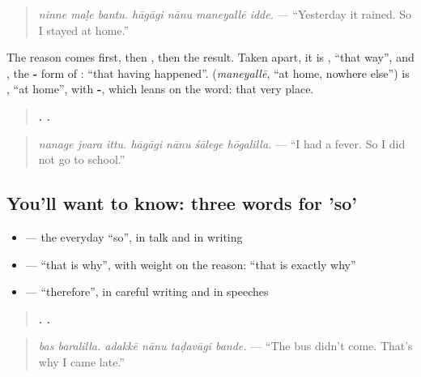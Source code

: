 \begin{quote}
\emph{ninne maḷe bantu. hāgāgi nānu maneyallē idde.} — \textquotedblleft{}Yesterday it rained. So I stayed at home.\textquotedblright{}
\end{quote}

The reason comes first, then \textbf{}, then the result. Taken apart, it is \textbf{}, \textquotedblleft{}that way\textquotedblright{}, and \textbf{}, the \textbf{-} form of \textbf{}: \textquotedblleft{}that having happened\textquotedblright{}. \textbf{} (\emph{maneyallē}, \textquotedblleft{}at home, nowhere else\textquotedblright{}) is \textbf{}, \textquotedblleft{}at home\textquotedblright{}, with \textbf{-}, which leans on the word: that very place.

\begin{quote}
\textbf{  .    .}
\end{quote}

\begin{quote}
\emph{nanage jvara ittu. hāgāgi nānu śālege hōgalilla.} — \textquotedblleft{}I had a fever. So I did not go to school.\textquotedblright{}
\end{quote}

\subsection*{You'll want to know: three words for 'so'}
\begin{itemize}
\raggedright
  \item \textbf{} — the everyday \textquotedblleft{}so\textquotedblright{}, in talk and in writing
  \item \textbf{} — \textquotedblleft{}that is why\textquotedblright{}, with weight on the reason: \textquotedblleft{}that is exactly why\textquotedblright{}
  \item \textbf{} — \textquotedblleft{}therefore\textquotedblright{}, in careful writing and in speeches
\end{itemize}

\begin{quote}
\textbf{ .    .}
\end{quote}

\begin{quote}
\emph{bas baralilla. adakkē nānu taḍavāgi bande.} — \textquotedblleft{}The bus didn't come. That's why I came late.\textquotedblright{}
\end{quote}

